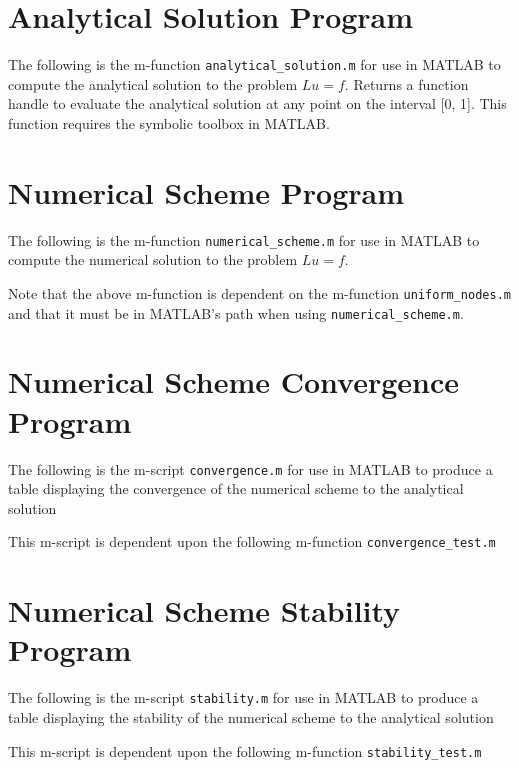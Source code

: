 \documentclass{article}
\begin{document}
\newpage
\begin{appendices}
  \section{Analytical Solution Program}\label{append_analytical}
  The following is the m-function \texttt{analytical\_solution.m} for use in
  MATLAB to compute the analytical solution to the problem $Lu = f$. Returns
  a function handle to evaluate the analytical solution at any point on the
  interval [0, 1]. This function requires the symbolic toolbox in MATLAB.
  

  \newpage
  \section{Numerical Scheme Program}\label{append_numerical}
  The following is the m-function \texttt{numerical\_scheme.m} for use in MATLAB
  to compute the numerical solution to the problem $Lu = f$.
  

  Note that the above m-function is dependent on the m-function
  \texttt{uniform\_nodes.m} and that it must be in MATLAB's path when using
  \texttt{numerical\_scheme.m}.
  

  \newpage
  \section{Numerical Scheme Convergence Program}\label{append_convergence}
  The following is the m-script \texttt{convergence.m} for use in MATLAB to
  produce a table displaying the convergence of the numerical scheme to the analytical
  solution
  

  This m-script is dependent upon the following m-function \texttt{convergence\_test.m}
  

  \newpage
  \section{Numerical Scheme Stability Program}\label{append_stability}
  The following is the m-script \texttt{stability.m} for use in MATLAB to
  produce a table displaying the stability of the numerical scheme to the analytical
  solution
  

  This m-script is dependent upon the following m-function \texttt{stability\_test.m}
  

\end{appendices}
\end{document}
